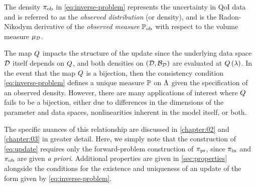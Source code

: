 \begin{defn}\label{defn:observed}
  The density $\operatorname*{\pi_{ob}}$ in \eqref{eq:inverse-problem} represents the uncertainty in QoI data and is referred to as the \emph{observed distribution} (or density), and is the Radon-Nikodym derivative of the \emph{observed measure} $\operatorname*{\mathbb{P}_{ob}}$ with respect to the volume measure $\mu_{\mathcal{D}}$.
\end{defn}

The map $Q$ impacts the structure of the update since the underlying data space $\mathcal{D}$ itself depends on $Q$, and both densities on $(\mathcal{D}, \mathcal{B}_{\mathcal{D}})$ are evaluated at $Q\left ( \lambda \right )$.
In the event that the map $Q$ is a bijection, then the consistency condition \eqref{eq:inverse-problem} defines a unique measure $\mathbb{P}$ on ${\Lambda}$ given the specification of an observed density.
However, there are many applications of interest where $Q$ fails to be a bijection, either due to differences in the dimensions of the parameter and data spaces, nonlinearities inherent in the model itself, or both. 


The specific nuances of this relationship are discussed in \ref{chapter:02} and \ref{chapter:03} in greater detail.
Here, we simply note that the construction of \eqref{eq:update} requires only the forward-problem construction of $\operatorname*{\pi_{pr}}$, since $\operatorname*{\pi_{in}}$ and $\operatorname*{\pi_{ob}}$ are given \emph{a priori}.
Additional properties are given in \ref{sec:properties} alongside the conditions for the existence and uniqueness of an update of the form given by \eqref{eq:inverse-problem}. 


